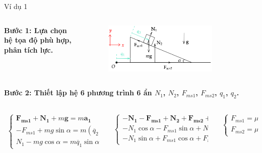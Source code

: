 \begin{frame}{Ví dụ 1}
\begin{columns}
    \begin{column}{0.5\textwidth}
\textbf{Bước 1: Lựa chọn hệ tọa độ phù hợp, phân tích lực.}
\end{column}
    \begin{column}{0.5\textwidth}
\begin{figure}
    \centering
    \includegraphics[width=0.8\textwidth]{Slides/Figure/wedgemass1.png}
\end{figure}
\end{column}
\end{columns}
\textbf{Bước 2: Thiết lập hệ 6 phương trình 6 ẩn \(N_1\), \(N_2\), \(F_{ms1}\), \(F_{ms2}\), \(q_1\), \(q_2\).}
\scriptsize
\begin{columns}
\begin{column}{0.4\textwidth}
\begin{align*}
    \begin{cases}
        \mathbf{F_{ms1}}+\mathbf{N_1}+m\mathbf{g}=m\mathbf{a_1} \\
        -F_{ms1}+mg\sin\alpha=m (\ddot{q_2}+\ddot{q_1}\cos\alpha) \\
        N_1-mg\cos\alpha=m\ddot{q_1}\sin\alpha
    \end{cases}
\end{align*}
\end{column}
\begin{column}{0.3\textwidth}
\begin{align*}
    \begin{cases}
        -\mathbf{N_1}-\mathbf{F_{ms1}}+\mathbf{N_2}+\mathbf{F_{ms2}}+M\mathbf{g}=M\mathbf{a_2}\\
        -N_1\cos\alpha-F_{ms1}\sin\alpha+N_2-Mg=0\\
        -N_1\sin\alpha+F_{ms1}\cos\alpha+F_{ms2}=M\ddot{q_2}
    \end{cases}
\end{align*}
\end{column}
\begin{column}{0.3\textwidth}
\begin{align*}
    \begin{cases}
        F_{ms1}=\mu_1 N_1 \\
        F_{ms2}=\mu_2 N_2
    \end{cases}
\end{align*}
\end{column}
\end{columns}
\normalsize
\end{frame}

